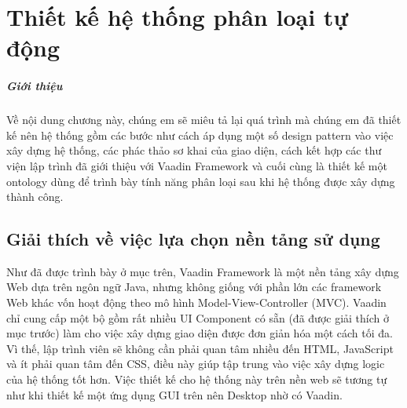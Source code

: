 \chapter{Thiết kế hệ thống phân loại tự động}
\paragraph{Giới thiệu} Về nội dung chương này, chúng em sẽ miêu tả lại quá trình mà chúng em đã thiết kế nên hệ thống gồm các bước như cách áp dụng một số design pattern vào việc xây dựng hệ thống, các phác thảo sơ khai của giao diện, cách kết hợp các thư viện lập trình đã giới thiệu với Vaadin Framework và cuối cùng là thiết kế một ontology dùng để trình bày tính năng phân loại sau khi hệ thống được xây dựng thành công.
\section{Giải thích về việc lựa chọn nền tảng sử dụng}
Như đã được trình bày ở mục trên, Vaadin Framework là một nền tảng xây dựng Web dựa trên ngôn ngữ Java, nhưng không giống với phần lớn các framework Web khác vốn hoạt động theo mô hình Model-View-Controller (MVC). Vaadin chỉ cung cấp một bộ gồm rất nhiều UI Component có sẵn (đã được giải thích ở mục trước) làm cho việc xây dựng giao diện được đơn giản hóa một cách tối đa. Vì thế, lập trình viên sẽ không cần phải quan tâm nhiều đến HTML, JavaScript và ít phải quan tâm đến CSS, điều này giúp tập trung vào việc xây dựng logic của hệ thống tốt hơn. Việc thiết kế cho hệ thống này trên nền web sẽ tương tự như khi thiết kế một ứng dụng GUI trên nên Desktop nhờ có Vaadin.
